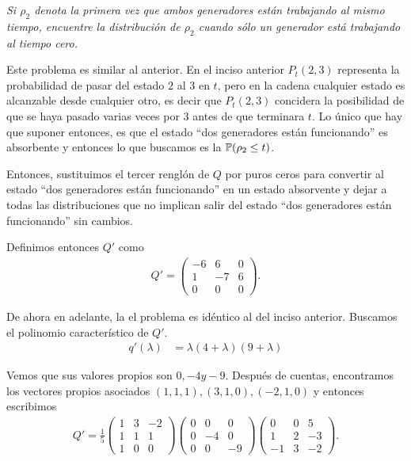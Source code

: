 \emph{
    Si $\rho_2$ denota la primera vez que ambos generadores est\'an trabajando al mismo tiempo, 
    encuentre la distribuci\'on de $\rho_2$ cuando s\'olo un generador est\'a trabajando al tiempo cero.\pn
}

\afterstatement\pn

Este problema es similar al anterior. En el inciso anterior $P_t(2,3)$ representa la probabilidad de pasar del estado $2$ al $3$
en $t$, pero en la cadena cualquier estado es alcanzable desde cualquier otro, es decir que $P_t(2,3)$ concidera la posibilidad
de que se haya pasado varias veces por $3$ antes de que terminara $t$. Lo único que hay que suponer entonces, es que el estado 
``dos generadores están funcionando'' es absorbente y entonces lo que buscamos es la $\P(\rho_2 \leq t)$.\pn

Entonces, sustituimos el tercer renglón de $Q$ por puros ceros para convertir al estado ``dos generadores están funcionando''
en un estado absorvente y dejar a todas las distribuciones que no implican salir del estado ``dos generadores están 
funcionando'' sin cambios.\pn

Definimos entonces $Q'$ como
\begin{align}
    Q'  =
        \begin{pmatrix}
            -6  &6  &   0  \\
            1   &-7 &   6  \\
            0   &0  &   0
        \end{pmatrix}.
\end{align}

De ahora en adelante, la el problema es idéntico al del inciso anterior. Buscamos el polinomio característico de $Q'$.
\begin{align}
    q'(\lambda)   &=  \lambda(4+\lambda)(9+\lambda)
\end{align}

Vemos que sus valores propios son $0, -4 y -9$. Después de cuentas, encontramos los vectores propios asociados
$(1, 1, 1),(3, 1, 0),(-2, 1, 0)$ y entonces escribimos
\begin{align}
    Q'  = \frac{1}{5}
        \begin{pmatrix}
            1   &3  &   -2 \\
            1   &1  &   1  \\
            1   &0  &   0
        \end{pmatrix}
        \begin{pmatrix}
            0   &0  &   0  \\
            0   &-4 &   0  \\
            0   &0  &   -9
        \end{pmatrix}        
        \begin{pmatrix}
            0   &0  &   5 \\
            1   &2  &   -3  \\
            -1  &3  &   -2
        \end{pmatrix}.
\end{align}

